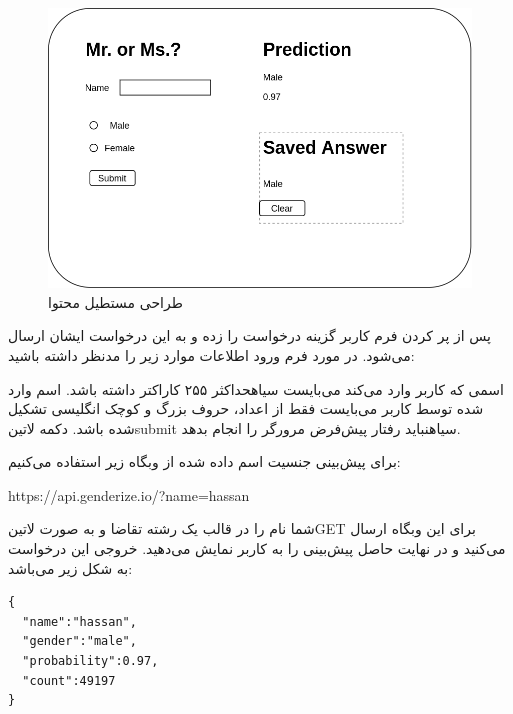 \documentclass[../main.tex]{subfiles}
\begin{document}
\begin{figure}[h]
  \centering
  \includegraphics[scale=0.3]{./genderize-content}
  \caption{طراحی مستطیل محتوا}
\end{figure}

پس از پر کردن فرم کاربر گزینه درخواست را زده و به این درخواست ایشان ارسال می‌شود. در مورد فرم ورود اطلاعات موارد زیر را مدنظر داشته باشید:

 اسمی که کاربر وارد می‌کند می‌بایست ‌سیاه{حداکثر} ۲۵۵ کاراکتر داشته باشد.
 اسم وارد شده توسط کاربر می‌بایست فقط از اعداد، حروف بزرگ و کوچک انگلیسی تشکیل شده باشد.
 دکمه ‌لاتین{submit} ‌سیاه{نباید} رفتار پیش‌فرض مرورگر را انجام بدهد.

برای پیش‌بینی جنسیت اسم داده شده از وبگاه زیر استفاده می‌کنیم:

\begin{latin}\begin{center}
https://api.genderize.io/?name=hassan
\end{center}\end{latin}

شما نام را در قالب یک رشته تقاضا و به صورت ‌لاتین{GET} برای این وبگاه ارسال می‌کنید و در نهایت حاصل پیش‌بینی را به کاربر نمایش می‌دهید. خروجی این درخواست به شکل زیر می‌باشد:

\begin{latin}
\begin{verbatim}
{
  "name":"hassan",
  "gender":"male",
  "probability":0.97,
  "count":49197
}
\end{verbatim}
\end{latin}
\end{document}

